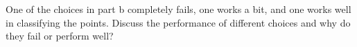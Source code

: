 \item {} 
One of the choices in part b completely fails, one works a bit, and one works well in classifying the points.
Discuss the performance of different choices and why do they fail or perform well?

